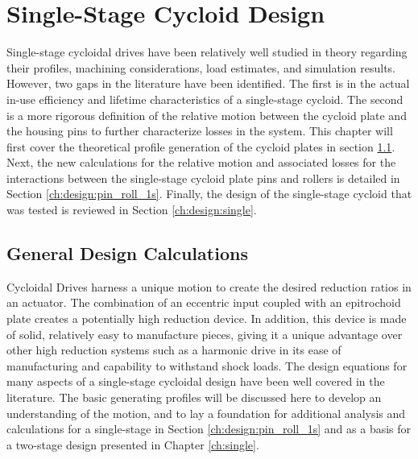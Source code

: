
\chapter{Single-Stage Cycloid Design}\label{ch:design_1s}

Single-stage cycloidal drives have been relatively well studied in theory regarding their profiles, machining considerations, load estimates, and simulation results. However, two gaps in the literature have been identified. The first is in the actual in-use efficiency and lifetime characteristics of a single-stage cycloid. The second is a more rigorous definition of the relative motion between the cycloid plate and the housing pins to further characterize losses in the system. This chapter will first cover the theoretical profile generation of the cycloid plates in section \ref{ch:design:basic_calc}. Next, the new calculations for the relative motion and associated losses for the interactions between the single-stage cycloid plate pins and rollers is detailed in Section \ref{ch:design:pin_roll_1s}. Finally, the design of the single-stage cycloid that was tested is reviewed in Section \ref{ch:design:single}.

\section{General Design Calculations} \label{ch:design:basic_calc}

Cycloidal Drives harness a unique motion to create the desired reduction ratios in an actuator. The combination of an eccentric input coupled with an epitrochoid plate creates a potentially high reduction device. In addition, this device is made of solid, relatively easy to manufacture pieces, giving it a unique advantage over other high reduction systems such as a harmonic drive in its ease of manufacturing and capability to withstand shock loads. The design equations for many aspects of a single-stage cycloidal design have been well covered in the literature. The basic generating profiles will be discussed here to develop an understanding of the motion, and to lay a foundation for additional analysis and calculations for a single-stage in Section \ref{ch:design:pin_roll_1s} and as a basis for a two-stage design presented in Chapter \ref{ch:single}. 

